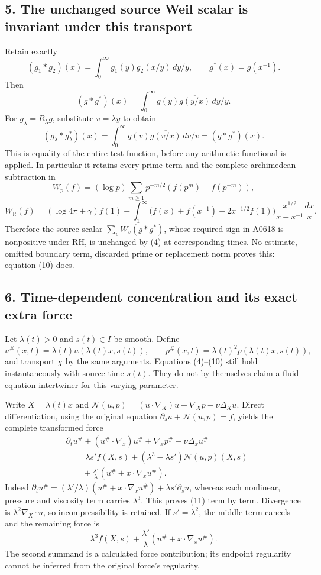 \subsection{5. The unchanged source Weil scalar is invariant under this
transport}\label{TranscriptStage:proof09:the-unchanged-source-weil-scalar-is-invariant-under-this-transport}

Retain exactly \[
(g_1*g_2)(x)=\int_0^\infty g_1(y)g_2(x/y)\,dy/y,
\qquad g^*(x)=\overline{g(x^{-1})}.
\] Then \[
(g*g^*)(x)=\int_0^\infty g(y)\overline{g(y/x)}\,dy/y.
\] For \(g_\lambda=R_\lambda g\), substitute \(v=\lambda y\) to obtain
\[
\boxed{(g_\lambda*g_\lambda^*)(x)=\int_0^\infty g(v)\overline{g(v/x)}\,dv/v=(g*g^*)(x).}
\tag{10}
\] This is equality of the entire test function, before any arithmetic
functional is applied. In particular it retains every prime term and the
complete archimedean subtraction in \[
W_p(f)=(\log p)\sum_{m\ge1}p^{-m/2}(f(p^m)+f(p^{-m})),
\] \[
W_{\mathbb R}(f)=(\log4\pi+\gamma)f(1)+
\int_1^\infty\bigl(f(x)+f(x^{-1})-2x^{-1/2}f(1)\bigr)
\frac{x^{1/2}}{x-x^{-1}}\frac{dx}{x}.
\] Therefore the source scalar \(\sum_vW_v(g*g^*)\), whose required sign
in A0618 is nonpositive under RH, is unchanged by (4) at corresponding
times. No estimate, omitted boundary term, discarded prime or
replacement norm proves this: equation (10) does.

\subsection{6. Time-dependent concentration and its exact extra
force}\label{TranscriptStage:proof09:time-dependent-concentration-and-its-exact-extra-force}

Let \(\lambda(t)>0\) and \(s(t)\in I\) be smooth. Define \[
u^\#(x,t)=\lambda(t)u(\lambda(t)x,s(t)),\qquad
p^\#(x,t)=\lambda(t)^2p(\lambda(t)x,s(t)),
\] and transport \(\chi\) by the same arguments. Equations (4)--(10)
still hold instantaneously with source time \(s(t)\). They do not by
themselves claim a fluid-equation intertwiner for this varying
parameter.

Write \(X=\lambda(t)x\) and
\(\mathcal N(u,p)= (u\cdot\nabla_X)u+\nabla_Xp-\nu\Delta_Xu\). Direct
differentiation, using the original equation
\(\partial_su+\mathcal N(u,p)=f\), yields the complete transformed force
\[
\boxed{\begin{aligned}
&\partial_tu^\#+(u^\#\cdot\nabla_x)u^\#+\nabla_xp^\#-\nu\Delta_xu^\#\\
&\quad=\lambda s'f(X,s)+(\lambda^3-\lambda s')\mathcal N(u,p)(X,s)\\
&\qquad+\frac{\lambda'}{\lambda}(u^\#+x\cdot\nabla_xu^\#).
\end{aligned}}
\tag{11}
\] Indeed
\(\partial_tu^\#=(\lambda'/\lambda)(u^\#+x\cdot\nabla_xu^\#)+\lambda s'\partial_su\),
whereas each nonlinear, pressure and viscosity term carries
\(\lambda^3\). This proves (11) term by term. Divergence is
\(\lambda^2\nabla_X\cdot u\), so incompressibility is retained. If
\(s'=\lambda^2\), the middle term cancels and the remaining force is \[
\lambda^3 f(X,s)+\frac{\lambda'}{\lambda}(u^\#+x\cdot\nabla_xu^\#).
\tag{12}
\] The second summand is a calculated force contribution; its endpoint
regularity cannot be inferred from the original force's regularity.

